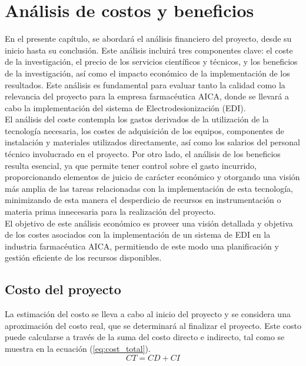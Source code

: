 \chapter{Análisis de costos y beneficios}
En el presente capítulo, se abordará el análisis financiero del proyecto, desde su inicio hasta su conclusión.
Este análisis incluirá tres componentes clave: el coste de la investigación, el precio de los servicios
científicos y técnicos, y los beneficios de la investigación, así como el impacto económico de la
implementación de los resultados. Este análisis es fundamental para evaluar tanto la calidad como la
relevancia del proyecto para la empresa farmacéutica AICA, donde se llevará a cabo la implementación
del sistema de Electrodesionización (EDI).\\

El análisis del coste contempla los gastos derivados de la utilización de la tecnología necesaria,
los costes de adquisición de los equipos, componentes de instalación y materiales utilizados directamente,
así como los salarios del personal técnico involucrado en el proyecto. Por otro lado, el análisis de los
beneficios resulta esencial, ya que permite tener control sobre el gasto incurrido, proporcionando elementos
de juicio de carácter económico y otorgando una visión más amplia de las tareas relacionadas con la
implementación de esta tecnología, minimizando de esta manera el desperdicio de recursos en instrumentación
o materia prima innecesaria para la realización del proyecto.\\

El objetivo de este análisis económico es proveer una visión detallada y objetiva de los costes asociados con
la implementación de un sistema de EDI en la industria farmacéutica AICA, permitiendo de este modo una
planificación y gestión eficiente de los recursos disponibles.\\


\section{Costo del proyecto}

La estimación del costo se lleva a cabo al inicio del proyecto y se considera una aproximación del costo
real, que se determinará al finalizar el proyecto. Este costo puede calcularse a través de la suma del
costo directo e indirecto, tal como se muestra en la ecuación (\ref{eq:cost_total}). \\

\begin{equation}
    \label{eq:cost_total}
    CT = CD + CI
\end{equation}

